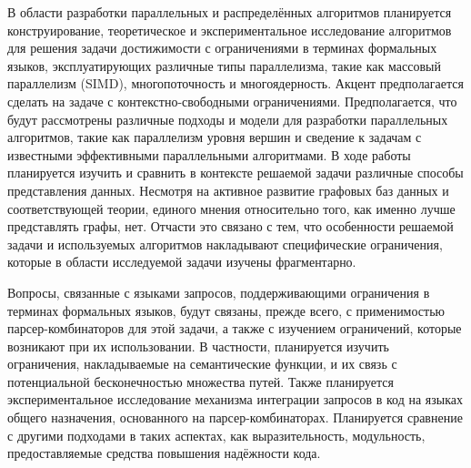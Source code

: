 \documentclass[12pt]{article}  %
\theoremstyle{remark}
\begin{document}
В области разработки параллельных и распределённых алгоритмов планируется конструирование, теоретическое и экспериментальное исследование алгоритмов для решения задачи достижимости с ограничениями в терминах формальных языков, эксплуатирующих различные типы параллелизма, такие как массовый параллелизм (SIMD), многопоточность и многоядерность. Акцент предполагается сделать на задаче с контекстно-свободными ограничениями. Предполагается, что будут рассмотрены различные подходы и модели для разработки параллельных алгоритмов, такие как параллелизм уровня вершин и сведение к задачам с известными эффективными параллельными алгоритмами. В ходе работы планируется изучить и сравнить в контексте решаемой задачи различные способы представления данных. Несмотря на активное развитие графовых баз данных и соответствующей теории, единого мнения относительно того, как именно лучше представлять графы, нет. Отчасти это связано с тем, что особенности решаемой задачи и используемых алгоритмов накладывают специфические ограничения, которые в области исследуемой задачи изучены фрагментарно.

Вопросы, связанные с языками запросов, поддерживающими ограничения в терминах формальных языков, будут связаны, прежде всего, с применимостью парсер-комбинаторов для этой задачи, а также с изучением ограничений, которые возникают при их использовании. В частности, планируется изучить ограничения, накладываемые на семантические функции, и их связь с потенциальной бесконечностью множества путей. Также планируется экспериментальное исследование механизма интеграции запросов в код на языках общего назначения, основанного на парсер-комбинаторах. Планируется сравнение с другими подходами в таких аспектах, как выразительность, модульность, предоставляемые средства повышения надёжности кода.
\end{document}
